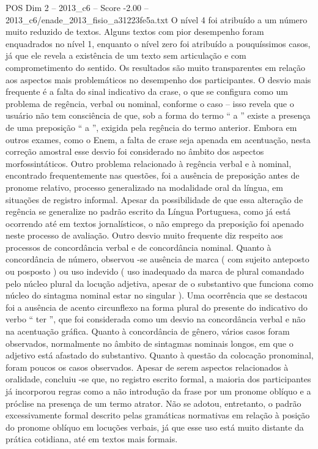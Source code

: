 \begin{textsample}{POS Dim 2 – 2013\_c6 – Score -2.00 – 2013\_c6/enade\_2013\_fisio\_a31223fe5a.txt}
O nível 4 foi atribuído a um número muito reduzido de textos.
Alguns textos com pior desempenho foram enquadrados no nível 1, enquanto o nível zero foi atribuído a pouquíssimos casos, já que ele revela a existência de um texto sem articulação e com comprometimento do sentido.
Os resultados são muito transparentes em relação aos aspectos mais problemáticos no desempenho dos participantes.
O desvio mais frequente é a falta do sinal indicativo da crase, o que se configura como um problema de regência, verbal ou nominal, conforme o caso – isso revela que o usuário não tem consciência de que, sob a forma do termo “ a ” existe a presença de uma preposição “ a ”, exigida pela regência do termo anterior.
Embora em outros exames, como o Enem, a falta de crase seja apenada em acentuação, nesta correção amostral esse desvio foi considerado no âmbito dos aspectos morfossintáticos.
Outro problema relacionado à regência verbal e à nominal, encontrado frequentemente nas questões, foi a ausência de preposição antes de pronome relativo, processo generalizado na modalidade oral da língua, em situações de registro informal.
Apesar da possibilidade de que essa alteração de regência se generalize no padrão escrito da Língua Portuguesa, como já está ocorrendo até em textos jornalísticos, o não emprego da preposição foi apenado neste processo de avaliação.
Outro desvio muito frequente diz respeito aos processos de concordância verbal e de concordância nominal.
Quanto à concordância de número, observou -se ausência de marca ( com sujeito anteposto ou posposto ) ou uso indevido ( uso inadequado da marca de plural comandado pelo núcleo plural da locução adjetiva, apesar de o substantivo que funciona como núcleo do sintagma nominal estar no singular ).
Uma ocorrência que se destacou foi a ausência de acento circunflexo na forma plural do presente do indicativo do verbo “ ter ”, que foi considerada como um desvio na concordância verbal e não na acentuação gráfica.
Quanto à concordância de gênero, vários casos foram observados, normalmente no âmbito de sintagmas nominais longos, em que o adjetivo está afastado do substantivo.
Quanto à questão da colocação pronominal, foram poucos os casos observados.
Apesar de serem aspectos relacionados à oralidade, concluiu -se que, no registro escrito formal, a maioria dos participantes já incorporou regras como a não introdução da frase por um pronome oblíquo e a próclise na presença de um termo atrator.
Não se adotou, entretanto, o padrão excessivamente formal descrito pelas gramáticas normativas em relação à posição do pronome oblíquo em locuções verbais, já que esse uso está muito distante da prática cotidiana, até em textos mais formais.

\end{textsample}
